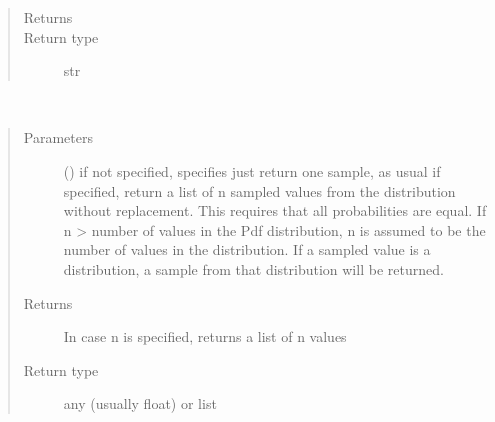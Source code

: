 \documentclass[letterpaper,10pt,english]{sphinxmanual}
\begin{document}
\begin{fulllineitems}
\begin{fulllineitems}
\begin{quote}
\begin{description}
\begin{itemize}
\end{itemize}

\item[{Returns}] \leavevmode
{}

\item[{Return type}] \leavevmode
str

\end{description}\end{quote}

\end{fulllineitems}


\begin{fulllineitems}
\label{\detokenize{Reference:salabim.Pdf.sample}}~\begin{quote}\begin{description}
\item[{Parameters}] \leavevmode
{} () \textendash{} if not specified, specifies just return one sample, as usual 
if specified, return a list of n sampled values from the distribution without replacement.
This requires that all probabilities are equal. 
If n \textgreater{} number of values in the Pdf distribution, n is assumed to be the number of values
in the distribution. 
If a sampled value is a distribution, a sample from that distribution will be returned.

\item[{Returns}] \leavevmode
{} \textendash{} In case n is specified, returns a list of n values

\item[{Return type}] \leavevmode
any (usually float) or list

\end{description}\end{quote}

\end{fulllineitems}


\end{fulllineitems}

\end{document}
